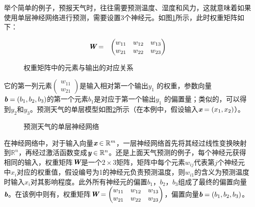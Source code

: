 \parinterval 举个简单的例子，预报天气时，往往需要预测温度、湿度和风力，这就意味着如果使用单层神经网络进行预测，需要设置3个神经元。如图\ref{fig:9-10}所示，此时权重矩阵如下：

\begin{eqnarray}
{\textbf{\em W}}&=&\begin{pmatrix} w_{11} & w_{12} & w_{13}\\ w_{21} & w_{22} & w_{23}\end{pmatrix}
\label{eq:9-105}
\end{eqnarray}

\begin{figure}[htp]
\centering

\caption{权重矩阵中的元素与输出的对应关系}
\label{fig:9-10}
\end{figure}

\noindent 它的第一列元素$ \begin{pmatrix} w_{11}\\ w_{21}\end{pmatrix} $是输入相对第一个输出$ y_1 $ 的权重，参数向量$ {\textbf{\em b}}=(b_1,b_2,b_3) $的第一个元素$ b_1 $是对应于第一个输出$ y_1 $ 的偏置量；类似的，可以得到$ y_2 $和$ y_3 $。预测天气的单层模型如图\ref{fig:9-11}所示（在本例中，假设输入$ {\textbf{\em x}}=(x_1,x_2) $）。

\begin{figure}[htp]
\centering

\caption{预测天气的单层神经网络}
\label{fig:9-11}
\end{figure}

\parinterval 在神经网络中，对于输入向量$ {\textbf{\em x}}\in {\mathbb R}^m $，一层神经网络首先将其经过线性变换映射到$ {\mathbb R}^n $，再经过激活函数变成${\textbf{\em y}}\in {\mathbb R}^n $。还是上面天气预测的例子，每个神经元获得相同的输入，权重矩阵$ {\textbf{\em W}} $是一个$ 2\times 3 $矩阵，矩阵中每个元素$ w_{ij} $代表第$ j $个神经元中$ x_{i} $对应的权重值，假设编号为1的神经元负责预测温度，则$ w_{i1} $的含义为预测温度时输入$ x_{i} $对其影响程度。此外所有神经元的偏置$ b_{1} $，$ b_{2} $，$ b_{3} $组成了最终的偏置向量$ {\textbf{\em b}}$。在该例中则有，权重矩阵$ {\textbf{\em W}}=\begin{pmatrix} w_{11} & w_{12} & w_{13}\\ w_{21} & w_{22} & w_{23}\end{pmatrix} $，偏置向量$ {\textbf{\em b}}=(b_1,b_2,b_3) $。

